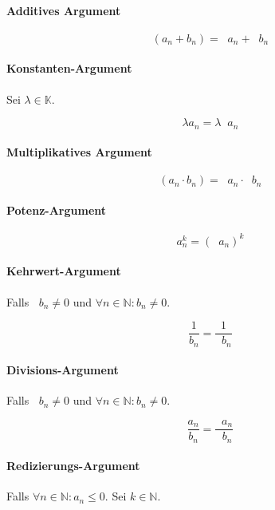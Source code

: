 \documentclass[a4paper, 11pt, accentcolor = tud3b]{tudreport}
\DeclareMathOperator{\liminfty}{\lim _ { n \rightarrow \infty }}
\begin{document}
            \paragraph{Additives Argument}
                \[ \liminfty (a _ n + b _ n) = \liminfty a _ n + \liminfty b _ n \]

            \paragraph{Konstanten-Argument}
                Sei $ \lambda \in \mathbb{K} $.

                \[ \liminfty \lambda a _ n = \lambda \liminfty a _ n \]

            \paragraph{Multiplikatives Argument}
                \[ \liminfty (a _ n \cdot b _ n) = \liminfty a _ n \cdot \liminfty b _ n \]

            \paragraph{Potenz-Argument}
                \[ \liminfty a _ n ^ k = (\liminfty a _ n) ^ k \]

            \paragraph{Kehrwert-Argument}
                Falls $ \liminfty b _ n \neq 0 $ und $ \forall n \in \mathbb{N} : b _ n \neq 0 $.

                \[ \liminfty \frac{1}{b _ n} = \frac{1}{\liminfty b _ n} \]

            \paragraph{Divisions-Argument}
                Falls $ \liminfty b _ n \neq 0 $ und $ \forall n \in \mathbb{N} : b _ n \neq 0 $.

                \[ \liminfty \frac{a _ n}{b _ n} = \frac{\liminfty a _ n}{\liminfty b _ n} \]

            \paragraph{Redizierungs-Argument}
                Falls $ \forall n \in \mathbb{N} : a _ n \leq 0 $. Sei $ k \in \mathbb{N} $.
\end{document}
